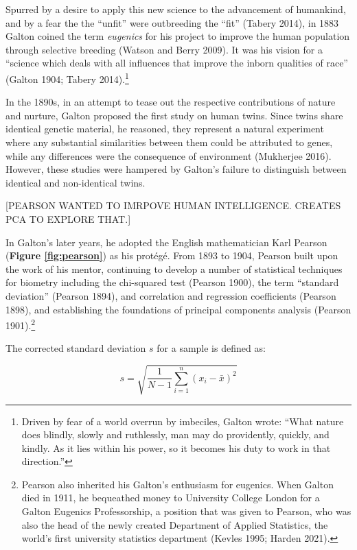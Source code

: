 \documentclass[
]{book}
\begin{document}
Spurred by a desire to apply this new science to the advancement of humankind, and by a fear the the ``unfit'' were outbreeding the ``fit'' (Tabery 2014), in 1883 Galton coined the term \emph{eugenics} for his project to improve the human population through selective breeding (Watson and Berry 2009). It was his vision for a ``science which deals with all influences that improve the inborn qualities of race'' (Galton 1904; Tabery 2014).\footnote{Driven by fear of a world overrun by imbeciles, Galton wrote: ``What nature does blindly, slowly and ruthlessly, man may do providently, quickly, and kindly. As it lies within his power, so it becomes his duty to work in that direction.''}

In the 1890s, in an attempt to tease out the respective contributions of nature and nurture, Galton proposed the first study on human twins. Since twins share identical genetic material, he reasoned, they represent a natural experiment where any substantial similarities between them could be attributed to genes, while any differences were the consequence of environment (Mukherjee 2016). However, these studies were hampered by Galton's failure to distinguish between identical and non-identical twins.

{[}PEARSON WANTED TO IMRPOVE HUMAN INTELLIGENCE. CREATES PCA TO EXPLORE THAT.{]}

In Galton's later years, he adopted the English mathematician Karl Pearson (\textbf{Figure \ref{fig:pearson}}) as his protégé. From 1893 to 1904, Pearson built upon the work of his mentor, continuing to develop a number of statistical techniques for biometry including the chi-squared test (Pearson 1900), the term ``standard deviation'' (Pearson 1894), and correlation and regression coefficients (Pearson 1898), and establishing the foundations of principal components analysis (Pearson 1901).\footnote{Pearson also inherited his Galton's enthusiasm for eugenics. When Galton died in 1911, he bequeathed money to University College London for a Galton Eugenics Professorship, a position that was given to Pearson, who was also the head of the newly created Department of Applied Statistics, the world's first university statistics department (Kevles 1995; Harden 2021).}

The corrected standard deviation \(s\) for a sample is defined as:

\begin{equation}
s = \sqrt{\frac{1}{N-1}{\sum_{i=1} ^n (x_i - \bar{x})^2}} \label{eq:sd}
\end{equation}
\end{document}
